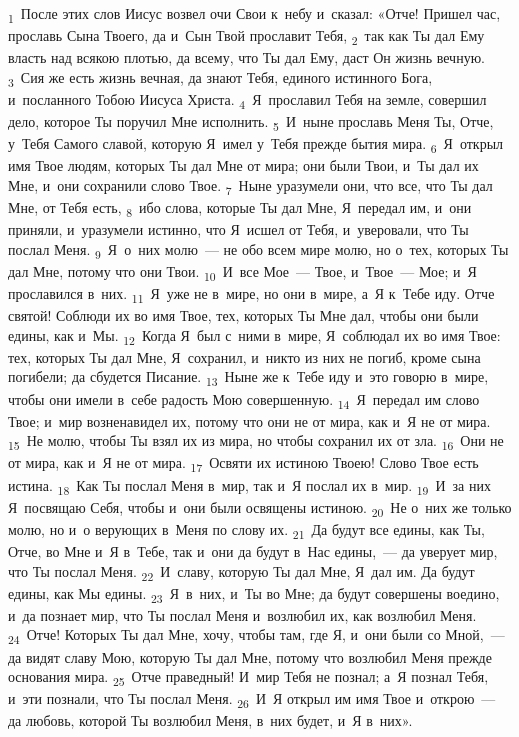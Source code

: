 \documentclass[a4paper,12pt]{article}
\begin{document}
\textsubscript{1}~После этих слов Иисус возвел очи Свои к~небу и~сказал: «Отче! Пришел час, прославь Сына Твоего, да и~Сын Твой прославит Тебя, \textsubscript{2}~так как Ты дал Ему власть над всякою плотью, да всему, что Ты дал Ему, даст Он жизнь вечную. \textsubscript{3}~Сия же есть жизнь вечная, да знают Тебя, единого истинного Бога, и~посланного Тобою Иисуса Христа. \textsubscript{4}~Я~прославил Тебя на земле, совершил дело, которое Ты поручил Мне исполнить. \textsubscript{5}~И~ныне прославь Меня Ты, Отче, у~Тебя Самого славой, которую Я~имел у~Тебя прежде бытия мира. \textsubscript{6}~Я~открыл имя Твое людям, которых Ты дал Мне от мира; они были Твои, и~Ты дал их Мне, и~они сохранили слово Твое. \textsubscript{7}~Ныне уразумели они, что все, что Ты дал Мне, от Тебя есть, \textsubscript{8}~ибо слова, которые Ты дал Мне, Я~передал им, и~они приняли, и~уразумели истинно, что Я~исшел от Тебя, и~уверовали, что Ты послал Меня. \textsubscript{9}~Я~о~них молю~--- не обо всем мире молю, но о~тех, которых Ты дал Мне, потому что они Твои. \textsubscript{10}~И~все Мое~--- Твое, и~Твое~--- Мое; и~Я прославился в~них. \textsubscript{11}~Я~уже не в~мире, но они в~мире, а~Я к~Тебе иду. Отче святой! Соблюди их во имя Твое, тех, которых Ты Мне дал, чтобы они были едины, как и~Мы. \textsubscript{12}~Когда Я~был с~ними в~мире, Я~соблюдал их во имя Твое: тех, которых Ты дал Мне, Я~сохранил, и~никто из них не погиб, кроме сына погибели; да сбудется Писание. \textsubscript{13}~Ныне же к~Тебе иду и~это говорю в~мире, чтобы они имели в~себе радость Мою совершенную. \textsubscript{14}~Я~передал им слово Твое; и~мир возненавидел их, потому что они не от мира, как и~Я не от мира. \textsubscript{15}~Не молю, чтобы Ты взял их из мира, но чтобы сохранил их от зла. \textsubscript{16}~Они не от мира, как и~Я не от мира. \textsubscript{17}~Освяти их истиною Твоею! Слово Твое есть истина. \textsubscript{18}~Как Ты послал Меня в~мир, так и~Я послал их в~мир. \textsubscript{19}~И~за них Я~посвящаю Себя, чтобы и~они были освящены истиною. \textsubscript{20}~Не о~них же только молю, но и~о верующих в~Меня по слову их. \textsubscript{21}~Да будут все едины, как Ты, Отче, во Мне и~Я в~Тебе, так и~они да будут в~Нас едины,~--- да уверует мир, что Ты послал Меня. \textsubscript{22}~И~славу, которую Ты дал Мне, Я~дал им. Да будут едины, как Мы едины. \textsubscript{23}~Я~в~них, и~Ты во Мне; да будут совершены воедино, и~да познает мир, что Ты послал Меня и~возлюбил их, как возлюбил Меня. \textsubscript{24}~Отче! Которых Ты дал Мне, хочу, чтобы там, где Я, и~они были со Мной,~--- да видят славу Мою, которую Ты дал Мне, потому что возлюбил Меня прежде основания мира. \textsubscript{25}~Отче праведный! И~мир Тебя не познал; а~Я познал Тебя, и~эти познали, что Ты послал Меня. \textsubscript{26}~И~Я открыл им имя Твое и~открою~--- да любовь, которой Ты возлюбил Меня, в~них будет, и~Я в~них». 
\end{document}
